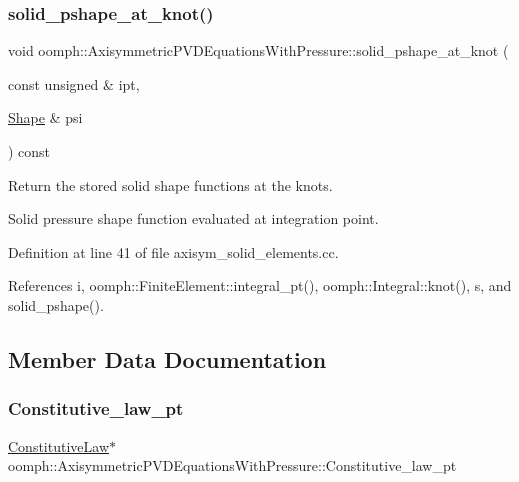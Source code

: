 \subsubsection{\texorpdfstring{solid\+\_\+pshape\+\_\+at\+\_\+knot()}{solid\_pshape\_at\_knot()}}
{\footnotesize\ttfamily void oomph\+::\+Axisymmetric\+P\+V\+D\+Equations\+With\+Pressure\+::solid\+\_\+pshape\+\_\+at\+\_\+knot (\begin{DoxyParamCaption}\item[{const unsigned \&}]{ipt,  }\item[{\hyperlink{classoomph_1_1Shape}{Shape} \&}]{psi }\end{DoxyParamCaption}) const\hspace{0.3cm}{\ttfamily [protected]}}



Return the stored solid shape functions at the knots. 

Solid pressure shape function evaluated at integration point. 

Definition at line 41 of file axisym\+\_\+solid\+\_\+elements.\+cc.



References i, oomph\+::\+Finite\+Element\+::integral\+\_\+pt(), oomph\+::\+Integral\+::knot(), s, and solid\+\_\+pshape().



\subsection{Member Data Documentation}
\mbox{\label{classoomph_1_1AxisymmetricPVDEquationsWithPressure_a792ad265951fa647ca47d4a71b1df02f}} 
\subsubsection{\texorpdfstring{Constitutive\+\_\+law\+\_\+pt}{Constitutive\_law\_pt}}
{\footnotesize\ttfamily \hyperlink{classoomph_1_1ConstitutiveLaw}{Constitutive\+Law}$\ast$ oomph\+::\+Axisymmetric\+P\+V\+D\+Equations\+With\+Pressure\+::\+Constitutive\+\_\+law\+\_\+pt\hspace{0.3cm}{\ttfamily [private]}}



